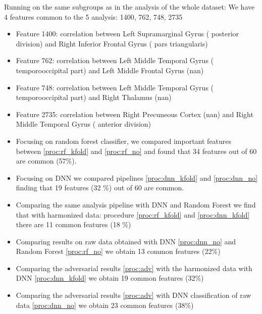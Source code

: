 \documentclass[10pt]{report}
\begin{document}
Running on the same subgroups as in the analysis of the whole dataset:
We have 4 features common to the 5 analysis: 1400, 762, 748, 2735
\begin{itemize}
\item Feature 1400: correlation between Left Supramarginal Gyrus ( posterior division) and Right Inferior Frontal Gyrus ( pars triangularis)
\item Feature 762: correlation between Left Middle Temporal Gyrus ( temporooccipital part) and Left Middle Frontal Gyrus (nan)
\item Feature 748: correlation between Left Middle Temporal Gyrus ( temporooccipital part) and Right Thalamus (nan)
\item Feature 2735: correlation between Right Precuneous Cortex (nan) and Right Middle Temporal Gyrus ( anterior division)
\end{itemize}


\begin{itemize}
\item Focusing on random forest classifier, we compared important features between \ref{proc:rf_kfold} and \ref{proc:rf_no} and found that 34 features out of 60 are common (57\%).
\item Focusing on DNN we compared pipelines \ref{proc:dnn_kfold} and \ref{proc:dnn_no} finding that 19 features (32 \%) out of 60 are common.
\item Comparing the same analysis pipeline with DNN and Random Forest we find that with harmonized data: procedure \ref{proc:rf_kfold} and \ref{proc:dnn_kfold} there are 11 common features (18 \%)
\item Comparing results on raw data obtained with DNN \ref{proc:dnn_no} and Random Forest \ref{proc:rf_no} we obtain 13 common features  (22\%)
\item Comparing the adversarial results \ref{proc:adv} with the harmonized data with DNN \ref{proc:dnn_kfold} we obtain 19 common features (32\%)
\item Comparing the adversarial results \ref{proc:adv} with DNN classification of raw data \ref{proc:dnn_no} we obtain 23 common features (38\%)
\end{itemize}








\end{document}
